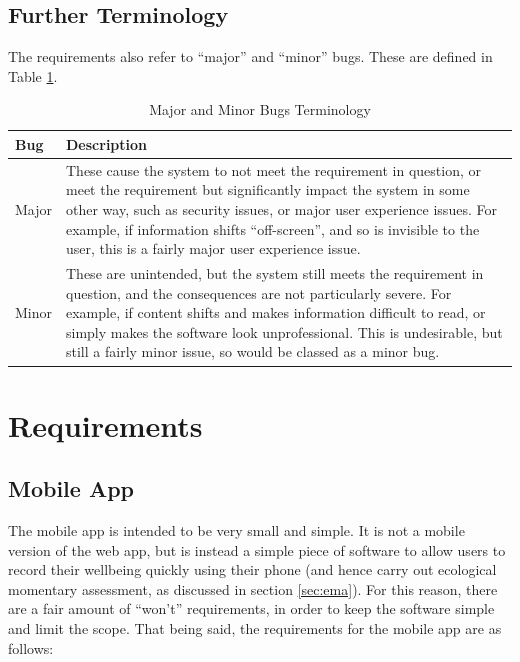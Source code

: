 \documentclass[11pt,openright,a4paper]{report}
\begin{document}
\subsection{Further Terminology}
The requirements also refer to \enquote{major} and \enquote{minor} bugs. These are defined in Table \ref{table:bugsterminology}.
\begin{table}[ht]
\centering
\caption{Major and Minor Bugs Terminology}
\label{table:bugsterminology}
\begin{tabular}{|p{4cm}|p{10cm}|}
\hline
\textbf{Bug} & \textbf{Description} \\ \hline
Major & These cause the system to not meet the requirement in question, or meet the requirement but significantly impact the system in some other way, such as security issues, or major user experience issues. For example, if information shifts \enquote{off-screen}, and so is invisible to the user, this is a fairly major user experience issue. \\  \hline
Minor & These are unintended, but the system still meets the requirement in question, and the consequences are not particularly severe. For example, if content shifts and makes information difficult to read, or simply makes the software look unprofessional. This is undesirable, but still a fairly minor issue, so would be classed as a minor bug.\\ \hline
\end{tabular}
\end{table}

\section{Requirements} \label{reqs}
\subsection{Mobile App}
The mobile app is intended to be very small and simple. It is not a mobile version of the web app, but is instead a simple piece of software to allow users to record their wellbeing quickly using their phone (and hence carry out ecological momentary assessment, as discussed in section \ref{sec:ema}). For this reason, there are a fair amount of \enquote{won't} requirements, in order to keep the software simple and limit the scope. That being said, the requirements for the mobile app are as follows:
\end{document}
